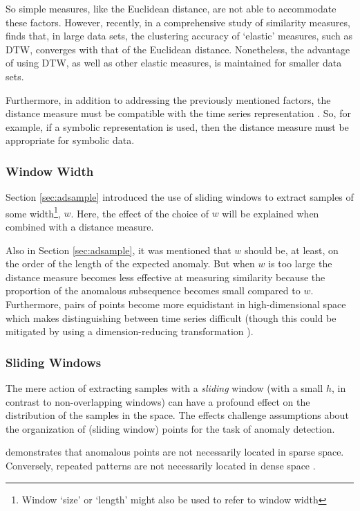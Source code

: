 So simple measures, like the Euclidean distance, are not able to accommodate these factors. However, recently, in a comprehensive study of similarity measures, \cite{Wang2013} finds that, in large data sets, the clustering accuracy of `elastic' measures, such as DTW, converges with that of the Euclidean distance. Nonetheless, the advantage of using DTW, as well as other elastic measures, is maintained for smaller data sets.

Furthermore, in addition to addressing the previously mentioned factors, the distance measure must be compatible with the time series representation \cite{Chakrabarti2002}. So, for example, if a symbolic representation is used, then the distance measure must be appropriate for symbolic data.


\subsubsection{Window Width}

Section \ref{sec:adsample} introduced the use of sliding windows to extract samples of some width\footnote{Window `size' or `length' might also be used to refer to window width}, $w$. Here, the effect of the choice of $w$ will be explained when combined with a distance measure.

Also in Section \ref{sec:adsample}, it was mentioned that $w$ should be, at least, on the order of the length of the expected anomaly. But when $w$ is too large the distance measure becomes less effective at measuring similarity because the proportion of the anomalous subsequence becomes small compared to $w$. Furthermore, pairs of points become more equidistant in high-dimensional space \cite{Hinneburg2000,Beyer1999} which makes distinguishing between time series difficult (though this could be mitigated by using a dimension-reducing transformation \cite{Keogh2001}).


\subsubsection{Sliding Windows}
\label{sec:sliding}

The mere action of extracting samples with a \emph{sliding} window (with a small $h$, in contrast to non-overlapping windows) can have a profound effect on the distribution of the samples in the space. The effects challenge assumptions about the organization of (sliding window) points for the task of anomaly detection.

\cite{Keogh2005} demonstrates that anomalous points are not necessarily located in sparse space. Conversely, repeated patterns are not necessarily located in dense space \cite{kitaguchi2004extracting,Chiu2003,Bentley1997}.

